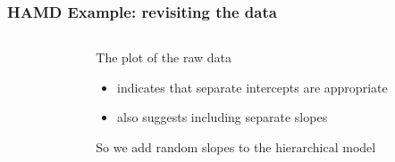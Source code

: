 \documentclass{beamer}
\begin{document}
\begin{frame}
    \frametitle{HAMD Example: revisiting the data}
    \vspace{-10mm}
    \begin{columns}
        \begin{column}{5cm}
            \begin{center}
            \end{center}
        \end{column}
        \begin{column}{5cm}
            The plot of the raw data\vspace{1mm}
            \begin{itemize}
                \item indicates that separate intercepts are appropriate\vspace{1mm}
                \item also suggests including separate slopes\vspace{2mm}
            \end{itemize}
            So we add random slopes to the hierarchical model
        \end{column}
    \end{columns}
\end{frame}
\end{document}
